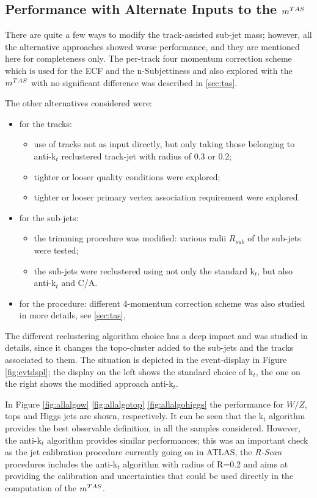 \subsection{Performance with Alternate Inputs to the $m^{TAS}$}
\label{sec:alternate}

There are quite a few ways to modify the track-assisted sub-jet mass; however, all the alternative approaches showed worse performance, and they are mentioned here for completeness only.
The per-track four momentum correction scheme which is used for the ECF and the n-Subjettiness and also explored with the $m^{TAS}$ with no significant difference was described in \ref{sec:tas}.

The other alternatives considered were: 
\begin{itemize}
 \item for the tracks:
 \begin{itemize}
   \item use of tracks not as input directly, but only taking those belonging to anti-k$_t$ reclustered track-jet with radius of 0.3 or 0.2;
   \item tighter or looser quality conditions were explored;
   \item tighter or looser primary vertex association requirement were explored.
 \end{itemize}
 \item for the sub-jets:
  \begin{itemize}
   \item the trimming procedure was modified: various radii $R_{sub}$ of the sub-jets were tested;
   \item the sub-jets were reclustered using not only the standard k$_t$, but also anti-k$_t$ and C/A.
  \end{itemize}
  \item for the procedure: different 4-momentum correction scheme was also studied in more details, see \ref{sec:tas}.
\end{itemize}

The different reclustering algorithm choice has a deep impact and was studied in details, since it changes the topo-cluster added to the sub-jets and the tracks associated to them. The situation is depicted in the event-display in Figure \ref{fig:evtdspl}; the display on the left shows the standard choice of k$_t$, the one on the right shows the modified approach anti-k$_t$. 

In Figure \ref{fig:allalgow} \ref{fig:allalgotop} \ref{fig:allalgohiggs} the performance for $W/Z$, tops and Higgs jets are shown, respectively. It can be seen that the k$_t$ algorithm provides the best observable definition, in all the samples considered. However, the anti-k$_t$ algorithm provides similar performances; this was an important check as the jet calibration procedure currently going on in ATLAS, the \textit{R-Scan} procedures includes the anti-k$_t$ algorithm with radius of R=0.2 and aims at providing the calibration and uncertainties that could be used directly in the computation of the $m^{TAS}$.

